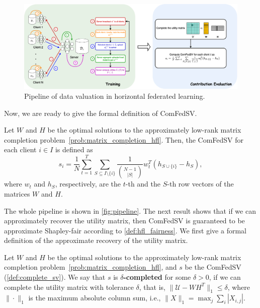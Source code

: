 \begin{figure}[t]
    \centering
    \includegraphics[width=\textwidth]{./figures/DataValuation.drawio.png}
    \caption{Pipeline of data valuation in horizontal federated learning.}
    \label{fig:pipeline}
\end{figure}

Now, we are ready to give the formal definition of ComFedSV. 
\begin{definition} \label{def:complete_sv}
    Let $W$ and  $H$ be the optimal solutions to the approximately low-rank matrix completion problem~\eqref{prob:matrix_completion_hfl}. Then, the ComFedSV for each client $i \in I$ is defined as 
    \begin{equation} \label{eq:complete_sv}
        s_i = \frac{1}{N} \sum_{t=1}^T\sum\limits_{S \subseteq I \setminus\{i\}} \frac{1}{\binom{N-1}{|S|}} w_t^T(h_{S\cup\{i\}} - h_S),
    \end{equation}
    where $w_t$ and $h_S$, respectively, are the $t$-th and the $S$-th row vectors of the matrices $W$ and $H$.
\end{definition}
The whole pipeline is shown in \autoref{fig:pipeline}. The next result shows that if we can approximately recover the utility matrix, then ComFedSV is guaranteed to be approximate Shapley-fair according to \autoref{def:hfl_fairness}. We first give a formal definition of the approximate recovery of the utility matrix. 

\begin{definition} \label{def:completeness}
    Let $W$ and  $H$ be the optimal solutions to the approximately low-rank matrix completion problem~\eqref{prob:matrix_completion_hfl}, and $s$ be the ComFedSV (\autoref{def:complete_sv}). We say that $s$ is \textbf{$\delta$-completed} for some $\delta>0$, if we can complete the utility matrix with tolerance $\delta$, that is,
    $\|\mathcal{U} - W H^T\|_1 \leq \delta$, where
    $\|\cdot\|_1$ is the maximum absolute column sum, i.e., $\|X\|_1 = \max_j \sum_i |X_{i,j}|$. 
\end{definition}

